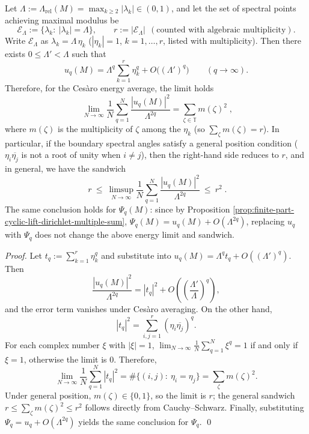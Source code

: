 \begin{theorem}\label{thm:finite-part-boundary-multiplicity-qaxis-energy}
Let
\(
\Lambda:=\Lambda_{\mathrm{rel}}(M)=\max_{k\ge2}|\lambda_k|\in(0,1)
\),
and let the set of spectral points achieving maximal modulus be
\[
\mathcal{E}_\Lambda:=\{\lambda_k:\ |\lambda_k|=\Lambda\},
\qquad
r:=|\mathcal{E}_\Lambda|\ \ (\text{counted with algebraic multiplicity}).
\]
Write \(\mathcal{E}_\Lambda\) as \(\lambda_k=\Lambda\,\eta_k\) (\(|\eta_k|=1\), \(k=1,\dots,r\), listed with multiplicity).
Then there exists \(0\le \Lambda'<\Lambda\) such that
\[
u_q(M)=\Lambda^{q}\sum_{k=1}^{r}\eta_k^{q}+O\!\bigl((\Lambda')^{q}\bigr)\qquad(q\to\infty).
\]
Therefore, for the Ces\`aro energy average, the limit holds
\[
\boxed{\;
\lim_{N\to\infty}\frac{1}{N}\sum_{q=1}^{N}\frac{|u_q(M)|^2}{\Lambda^{2q}}
=\sum_{\zeta\in\mathbb{T}} m(\zeta)^2\; },
\]
where \(m(\zeta)\) is the multiplicity of \(\zeta\) among the \(\eta_k\) (so \(\sum_\zeta m(\zeta)=r\)).
In particular, if the boundary spectral angles satisfy a general position condition (\(\eta_i\overline{\eta_j}\) is not a root of unity when \(i\neq j\)), then the right-hand side reduces to \(r\), and in general, we have the sandwich
\[
\boxed{\;
r\ \le\ \limsup_{N\to\infty}\frac{1}{N}\sum_{q=1}^{N}\frac{|u_q(M)|^2}{\Lambda^{2q}}\ \le\ r^2\; }.
\]
The same conclusion holds for \(\Psi_q(M)\): since by Proposition \ref{prop:finite-part-cyclic-lift-dirichlet-multiple-sum},
\(
\Psi_q(M)=u_q(M)+O(\Lambda^{2q})
\),
replacing \(u_q\) with \(\Psi_q\) does not change the above energy limit and sandwich.
\end{theorem}
\begin{proof}
Let
\(
t_q:=\sum_{k=1}^{r}\eta_k^{q}
\)
and substitute into \(u_q(M)=\Lambda^{q}t_q+O((\Lambda')^{q})\).
Then
\[
\frac{|u_q(M)|^2}{\Lambda^{2q}}
=|t_q|^2+O\!\left(\left(\frac{\Lambda'}{\Lambda}\right)^{q}\right),
\]
and the error term vanishes under Ces\`aro averaging.
On the other hand,
\[
|t_q|^2=\sum_{i,j=1}^{r}(\eta_i\overline{\eta_j})^{q}.
\]
For each complex number \(\xi\) with \(|\xi|=1\),
\(
\lim_{N\to\infty}\frac{1}{N}\sum_{q=1}^{N}\xi^{q}=1
\)
if and only if \(\xi=1\), otherwise the limit is \(0\).
Therefore,
\[
\lim_{N\to\infty}\frac{1}{N}\sum_{q=1}^{N}|t_q|^2
=\#\{(i,j):\ \eta_i=\eta_j\}
=\sum_{\zeta} m(\zeta)^2.
\]
Under general position, \(m(\zeta)\in\{0,1\}\), so the limit is \(r\); the general sandwich \(r\le \sum_\zeta m(\zeta)^2\le r^2\) follows directly from Cauchy--Schwarz.
Finally, substituting \(\Psi_q=u_q+O(\Lambda^{2q})\) yields the same conclusion for \(\Psi_q\). \qed
\end{proof}

